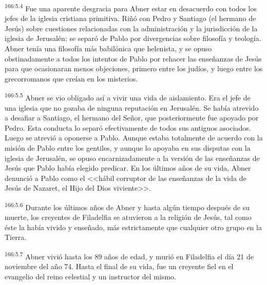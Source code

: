 \par 
\textsuperscript{166:5.4} Fue una aparente desgracia para Abner estar en desacuerdo con todos los jefes de la iglesia cristiana primitiva. Riñó con Pedro y Santiago (el hermano de Jesús) sobre cuestiones relacionadas con la administración y la jurisdicción de la iglesia de Jerusalén; se separó de Pablo por divergencias sobre filosofía y teología. Abner tenía una filosofía más babilónica que helenista, y se opuso obstinadamente a todos los intentos de Pablo por rehacer las enseñanzas de Jesús para que ocasionaran menos objeciones, primero entre los judíos, y luego entre los grecorromanos que creían en los misterios.

\par 
\textsuperscript{166:5.5} Abner se vio obligado así a vivir una vida de aislamiento. Era el jefe de una iglesia que no gozaba de ninguna reputación en Jerusalén. Se había atrevido a desafiar a Santiago, el hermano del Señor, que posteriormente fue apoyado por Pedro. Esta conducta lo separó efectivamente de todos sus antiguos asociados. Luego se atrevió a oponerse a Pablo. Aunque estaba totalmente de acuerdo con la misión de Pablo entre los gentiles, y aunque lo apoyaba en sus disputas con la iglesia de Jerusalén, se opuso encarnizadamente a la versión de las enseñanzas de Jesús que Pablo había elegido predicar. En los últimos años de su vida, Abner denunció a Pablo como el <<hábil corruptor de las enseñanzas de la vida de Jesús de Nazaret, el Hijo del Dios viviente>>.

\par 
\textsuperscript{166:5.6} Durante los últimos años de Abner y hasta algún tiempo después de su muerte, los creyentes de Filadelfia se atuvieron a la religión de Jesús, tal como éste la había vivido y enseñado, más estrictamente que cualquier otro grupo en la Tierra.

\par 
\textsuperscript{166:5.7} Abner vivió hasta los 89 años de edad, y murió en Filadelfia el día 21 de noviembre del año 74. Hasta el final de su vida, fue un creyente fiel en el evangelio del reino celestial y un instructor del mismo.
